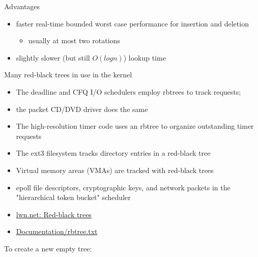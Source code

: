 \begin{frame}
  \begin{block}{Advantages}
    \begin{itemize}
    \item faster real-time bounded worst case performance for insertion and deletion
      \begin{itemize}
      \item usually at most two rotations%
      \end{itemize}
    \item slightly slower (but still $O(log n)$) lookup time
    \end{itemize}
  \end{block}
  \begin{block}{Many red-black trees in use in the kernel}
    \begin{itemize}
    \item The deadline and CFQ I/O schedulers employ rbtrees to track requests;
    \item the packet CD/DVD driver does the same
    \item The high-resolution timer code uses an rbtree to organize outstanding timer
      requests
    \item The ext3 filesystem tracks directory entries in a red-black tree
    \item Virtual memory areas (VMAs) are tracked with red-black trees
    \item epoll file descriptors, cryptographic keys, and network packets in the
      "hierarchical token bucket" scheduler
    \end{itemize}
  \end{block}
\end{frame}

\begin{itemize}
\item \href{http://lwn.net/Articles/184495/}{lwn.net: Red-black trees}
\item \href{https://www.kernel.org/doc/Documentation/rbtree.txt}{Documentation/rbtree.txt}
\end{itemize}

\begin{frame}
  \begin{block}{}
    \begin{center}
    \end{center}
  \end{block}
  To create a new empty tree:
  \begin{center}
  \end{center}
\end{frame}


